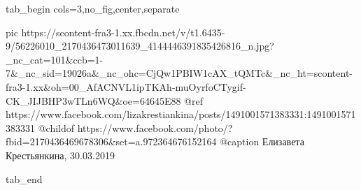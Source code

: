  
 
 
 
 

\ifcmt
  tab_begin cols=3,no_fig,center,separate

    pic https://scontent-fra3-1.xx.fbcdn.net/v/t1.6435-9/56226010_2170436473011639_4144446391835426816_n.jpg?_nc_cat=101&ccb=1-7&_nc_sid=19026a&_nc_ohc=CjQw1PBIW1cAX_tQMTc&_nc_ht=scontent-fra3-1.xx&oh=00_AfACNVL1ipTKAh-muOyrfoCTygif-CK_JIJBHP3wTLn6WQ&oe=64645E88
    @ref https://www.facebook.com/lizakrestiankina/posts/1491001571383331:1491001571383331
    @childof https://www.facebook.com/photo/?fbid=2170436469678306&set=a.972364676152164
    @caption Елизавета Крестьянкина, 30.03.2019

  tab_end
\fi
